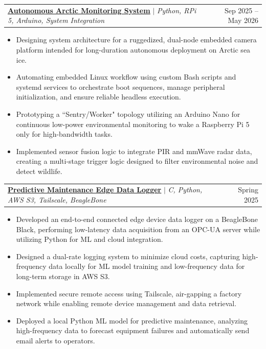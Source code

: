 \documentclass[letterpaper,11pt]{article}
\makeatletter
\newcommand{\resumeItem}[1]{
  \item\small{
    {#1 \vspace{-2pt}}
  }
}
\newcommand{\resumeProjectHeading}[2]{
    \item
    \begin{tabular*}{0.97\textwidth}{l@{\extracolsep{\fill}}r}
      \small#1 & #2 \\
    \end{tabular*}\vspace{-7pt}
}
\newcommand{\resumeItemListStart}{\begin{itemize}}
\newcommand{\resumeItemListEnd}{\end{itemize}\vspace{-5pt}}
\makeatother
\begin{document}
      \resumeProjectHeading
      {\textbf{\underline{\href{https://github.com/proconlon/EC463_Team_01_Polar_Eyes}{Autonomous Arctic Monitoring System}}} $|$ \emph{Python, RPi 5, Arduino, System Integration}}{Sep 2025 -- May 2026}
      \resumeItemListStart
        \resumeItem{Designing system architecture for a ruggedized, dual-node embedded camera platform intended for long-duration autonomous deployment on Arctic sea ice.}
        \resumeItem{Automating embedded Linux workflow using custom Bash scripts and systemd services to orchestrate boot sequences, manage peripheral initialization, and ensure reliable headless execution.}
        \resumeItem{Prototyping a ``Sentry/Worker" topology utilizing an Arduino Nano for continuous low-power environmental monitoring to wake a Raspberry Pi 5 only for high-bandwidth tasks.}
        \resumeItem{Implemented sensor fusion logic to integrate PIR and mmWave radar data, creating a multi-stage trigger logic designed to filter environmental noise and detect wildlife.}
      \resumeItemListEnd


    \resumeProjectHeading
      {\textbf{\underline{\href{https://github.com/proconlon/pm-edge-data-logger}{Predictive Maintenance Edge Data Logger}}} $|$ \emph{C, Python, AWS S3, Tailscale, BeagleBone}}{Spring 2025}
      \resumeItemListStart
        \resumeItem{Developed an end-to-end connected edge device data logger on a BeagleBone Black, performing low-latency data acquisition from an OPC-UA server while utilizing Python for ML and cloud integration.}
        \resumeItem{Designed a dual-rate logging system to minimize cloud costs, capturing high-frequency data locally for ML model training and low-frequency data for long-term storage in AWS S3.}
        \resumeItem{Implemented secure remote access using Tailscale, air-gapping a factory network while enabling remote device management and data retrieval.}
        \resumeItem{Deployed a local Python ML model for predictive maintenance, analyzing high-frequency data to forecast equipment failures and automatically send email alerts to operators.}
      \resumeItemListEnd

\end{document}
